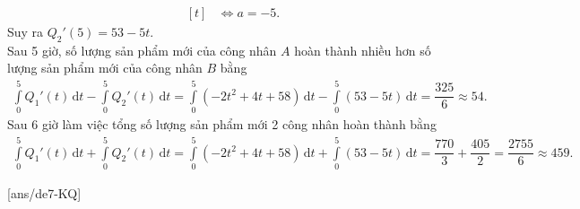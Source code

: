 \begin{ex}
{\begin{itemchoice}
$$\begin{aligned}[t]
				& \Leftrightarrow a=-5.
			\end{aligned}$$
		Suy ra $Q_2'(5)=53-5t$.\\
		Sau 5 giờ, số lượng sản phẩm mới của công nhân $A$ hoàn thành nhiều hơn số lượng sản phẩm mới của công nhân $B$ bằng 
		\begin{align*}
			\displaystyle\int\limits_0^5 Q_1'(t) \mathrm{\,d}t -\displaystyle\int\limits_0^5 Q_2'(t) \mathrm{\,d}t =\displaystyle\int\limits_0^5 (-2t^2+4t+58) \mathrm{\,d}t -\displaystyle\int\limits_0^5 (53-5t) \mathrm{\,d}t =\dfrac{325}{6} \approx 54.
		\end{align*}
			\itemch Sau $6$ giờ làm việc tổng số lượng sản phẩm mới 2 công nhân hoàn thành bằng 
		\begin{align*}
			\displaystyle\int\limits_0^5 Q_1'(t) \mathrm{\,d}t +\displaystyle\int\limits_0^5 Q_2'(t) \mathrm{\,d}t =\displaystyle\int\limits_0^5 (-2t^2+4t+58) \mathrm{\,d}t +\displaystyle\int\limits_0^5 (53-5t) \mathrm{\,d}t =\dfrac{770}{3}+\dfrac{405}{2}= \dfrac{2755}{6} \approx 459.
		\end{align*}
		\end{itemchoice}
	}
\end{ex}



\TNSA

[ans/de7-KQ]

